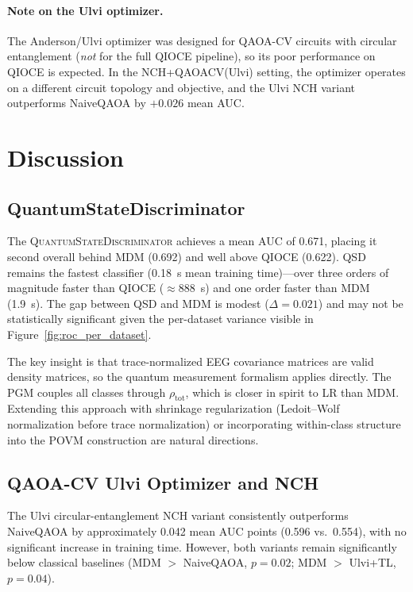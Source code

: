 \documentclass{article}
\begin{document}
\paragraph{Note on the Ulvi optimizer.}
The Anderson/Ulvi optimizer was designed for QAOA-CV circuits with circular
entanglement (\emph{not} for the full QIOCE pipeline), so its poor performance
on QIOCE is expected.  In the NCH+QAOACV(Ulvi) setting, the optimizer
operates on a different circuit topology and objective, and the Ulvi NCH
variant outperforms NaiveQAOA by $+0.026$ mean AUC.


\section{Discussion}
\label{sec:discussion}

\subsection{QuantumStateDiscriminator}

The \textsc{QuantumStateDiscriminator} achieves a mean AUC of 0.671, placing
it second overall behind MDM (0.692) and well above QIOCE (0.622).  QSD
remains the fastest classifier (0.18~s mean training time)---over three orders
of magnitude faster than QIOCE ($\approx$888~s) and one order faster than
MDM (1.9~s).  The gap between QSD and MDM is modest ($\Delta=0.021$) and
may not be statistically significant given the per-dataset variance visible in
Figure~\ref{fig:roc_per_dataset}.

The key insight is that trace-normalized EEG covariance matrices are valid
density matrices, so the quantum measurement formalism applies directly.
The PGM couples all classes through $\rho_{\text{tot}}$, which is closer in
spirit to LR than MDM.  Extending this approach with shrinkage regularization
(Ledoit--Wolf normalization before trace normalization) or incorporating
within-class structure into the POVM construction are natural directions.

\subsection{QAOA-CV Ulvi Optimizer and NCH}

The Ulvi circular-entanglement NCH variant consistently outperforms NaiveQAOA
by approximately 0.042 mean AUC points (0.596 vs.\ 0.554), with no significant
increase in training time.  However, both variants remain significantly below
classical baselines (MDM $>$ NaiveQAOA, $p=0.02$; MDM $>$ Ulvi+TL, $p=0.04$).
\end{document}
